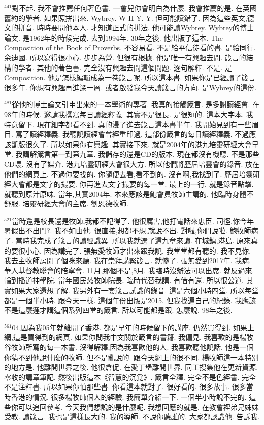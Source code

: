 \documentclass{book}
\begin{document}
$^{441}$對不起.
我不會推薦任何著色書.
一會兒你會明白為什麼.
我會推薦的是.
在英國舊約的學者.
如果照拼出來.
Wybrey.
W-H-Y.
Y.
但可能讀錯了.
因為這些英文,德文的拼音.
時時要問他本人.
才知道正式的拼法.
他可能讀Wybrey.
Wybrey的博士論文.
是1962年的時候完成.
去到1994年.
30年之後.
他出版了這本.
The Composition of the Book of Proverbs.
不容易看.
不是給平信徒看的書.
是給同行.
余迪國.
所以寫得很小心.
步步為營.
但很有根據.
他是唯一有興趣去問.
箴言的結構的學者.
其他的著色書.
完全沒有興趣去問這個問題.
逐句解釋.
不是.
是Composition.
他是怎樣編輯成為一卷箴言呢.
所以這本書.
如果你是已經讀了箴言很多年.
你想有興趣再進深一層.
或者啟發我今天讀箴言的方向.
是Wybrey的這份.

$^{481}$從他的博士論文引申出來的一本學術的專著.
我真的接觸箴言.
是多謝讀經會.
在98年的時候.
邀請我撰寫每日讀經釋義.
其實不是很長.
是很短的.
這本大字本.
我特意留下.
現在細字都看不到.
真的浸了進去箴言這本書半年.
我開始見到有一些眉目.
寫了讀經釋義.
我聽說讀經會曾經重印過.
這部份箴言的每日讀經釋義.
不過應該斷版很久了.
所以如果你有興趣.
其實接下來.
就是2004年的港九培靈研經大會早堂.
我講解箴言第一到第九章.
我儲存的還是CD的版本.
現在都沒有機聽.
不是那些CD壞.
沒有了媒介.
港九培靈研經大會很大方.
所以他們將歷屆培靈會的錄音.
放在他們的網頁上.
不過你要找的.
你隨便去看,看不到的.
沒有啊,我找到了.
歷屆培靈研經大會都是文字的撮要.
你再進去文字撮要的每一堂.
最上的一行.
就是錄音點擊.
就聽到原汁原味.
當年,其實2004年.
本來應該是鮑會員牧師主講的.
他臨時身體不舒服.
培靈研經大會的主席.
劉恩德牧師.

$^{521}$當時還是校長還是牧師,我都不記得了.
他很厲害,他打電話來忠臣.
司徑,你今年暑假出不出門?.
我不如由他.
很直接,想都不想,就說不出.
對啦,你們說啦.
鮑牧師病了.
當時我完成了箴言的讀經識異.
所以我就選了這九章來讀.
在城鎮,港島.
原來真的要很小心.
因為講完了.
張無愛牧師才出來跟我說.
我堂堂都有聽的.
我不見你.
我去主牧師房開了個咪來聽.
我在崇拜講緊箴言.
就慘了.
張無愛到2017年.
我病.
華人基督教聯會的陪寧會.
11月,那個不是,8月.
我臨時沒辦法可以出席.
就反過來.
輪到播道神學院.
當年國民慈牧師院長.
臨時代替我講.
有借有還.
所以很公道.
其實如果大家還想了解.
我另外有一套箴言試識的錄音.
這是六個小時四堂.
所以每堂都是一個半小時.
跟今天一樣.
這個年份出版是2015.
但我找遍自己的紀錄.
我應該不是這麼遲才講這個系列四堂的箴言.
所以可能都是跟.
怎麼說.
98年之後.

$^{561}$04,因為我05年就離開了香港.
都是早年的時候留下的講座.
仍然買得到.
如果上網,這是買得到的網頁.
如果你問我中文關於箴言的書籍.
我偏見.
我喜歡的是楊牧谷牧師所寫的每一本書.
沒得解釋,因為我喜歡他的人.
我喜歡聽他說話.
他是一個你猜不到他說什麼的牧師.
但不是亂說的.
跟今天網上的很不同.
楊牧師這一本特別的地方是.
他離開世界之後.
他很倉促.
在愛丁堡離開世界.
同工搜集他在更新資源.
零收的講章筆記.
然後出版這本《智慧的沉覓》.
箴言全釋.
完全不是色經書.
完全不是注釋書.
所以如果你怕那些書.
你看這本就對了.
很好看的.
很多故事.
很多當時香港的情況.
很多楊牧師個人的經驗.
我簡單介紹一下.
一個半小時說不完的.
這些你可以追回參考.
今天我們想說的是什麼呢.
我想回應的就是.
在教會裡弟兄姊妹受教.
讀箴言.
我也是這樣長大的.
我的導師.
不說你聽誰的.
大家都認識他.
告訴我.
\end{document}
